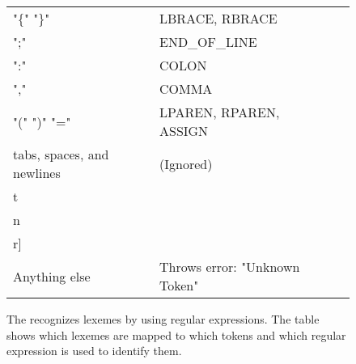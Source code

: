 \begin{figure}[ht]
\begin{tabular}{|l|l|l|}
    \hline
    "\{" "\}" & LBRACE, RBRACE & \regex{"{" "}"} \\
    ";" & END\_OF\_LINE & \regex{[;]} \\
    ":" & COLON & \regex{":"} \\
    "," & COMMA & \regex{[,]} \\
    "(" ")" "=" & LPAREN, RPAREN, ASSIGN & \regex{"("} \regex{")"} \regex{"="} \\
    tabs, spaces, and newlines & (Ignored) & \regex{[ \\t\\n\\r]} \\
    Anything else & Throws error: "Unknown Token" & \regex{[.]} \\
    \bottomrule
  \end{tabular}
  \caption{The \lexer{} recognizes lexemes by using regular
  expressions. The table shows which lexemes are mapped to which tokens and which
regular expression is used to identify them.}
  \label{fig:SymbolMap}
\end{figure}

